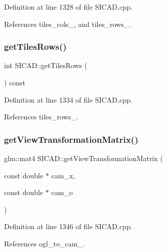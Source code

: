 Definition at line 1328 of file S\+I\+C\+A\+D.\+cpp.



References tiles\+\_\+cols\+\_\+, and tiles\+\_\+rows\+\_\+.

\mbox{\label{classSICAD_a9e3dd48dfd83ea0bd00d64dacc4fbd40}} 
\subsubsection{\texorpdfstring{get\+Tiles\+Rows()}{getTilesRows()}}
{\footnotesize\ttfamily int S\+I\+C\+A\+D\+::get\+Tiles\+Rows (\begin{DoxyParamCaption}{ }\end{DoxyParamCaption}) const}



Definition at line 1334 of file S\+I\+C\+A\+D.\+cpp.



References tiles\+\_\+rows\+\_\+.

\mbox{\label{classSICAD_a1bdece095865249df4cb4e6a7ad2901e}} 
\subsubsection{\texorpdfstring{get\+View\+Transformation\+Matrix()}{getViewTransformationMatrix()}}
{\footnotesize\ttfamily glm\+::mat4 S\+I\+C\+A\+D\+::get\+View\+Transformation\+Matrix (\begin{DoxyParamCaption}\item[{const double $\ast$}]{cam\+\_\+x,  }\item[{const double $\ast$}]{cam\+\_\+o }\end{DoxyParamCaption})\hspace{0.3cm}{\ttfamily [private]}}



Definition at line 1346 of file S\+I\+C\+A\+D.\+cpp.



References ogl\+\_\+to\+\_\+cam\+\_\+.

\mbox{\label{classSICAD_af65b5ad73e2c0e872face157b56bd68b}} 
